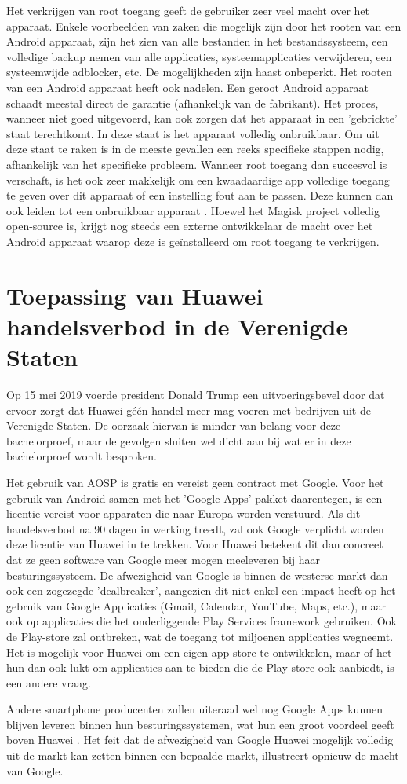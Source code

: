 Het verkrijgen van root toegang geeft de gebruiker zeer veel macht over het apparaat. Enkele voorbeelden van zaken die mogelijk zijn door het rooten van een Android apparaat, zijn het zien van alle bestanden in het bestandssysteem, een volledige backup nemen van alle applicaties, systeemapplicaties verwijderen, een systeemwijde adblocker, etc. De mogelijkheden zijn haast onbeperkt. Het rooten van een Android apparaat heeft ook nadelen. Een geroot Android apparaat schaadt meestal direct de garantie (afhankelijk van de fabrikant). Het proces, wanneer niet goed uitgevoerd, kan ook zorgen dat het apparaat in een 'gebrickte' staat terechtkomt. In deze staat is het apparaat volledig onbruikbaar. Om uit deze staat te raken is in de meeste gevallen een reeks specifieke stappen nodig, afhankelijk van het specifieke probleem. Wanneer root toegang dan succesvol is verschaft, is het ook zeer makkelijk om een kwaadaardige app volledige toegang te geven over dit apparaat of een instelling fout aan te passen. Deze kunnen dan ook leiden tot een onbruikbaar apparaat \autocite{phelps_root-cons}. Hoewel het Magisk project volledig open-source is, krijgt nog steeds een externe ontwikkelaar de macht over het Android apparaat waarop deze is geïnstalleerd om root toegang te verkrijgen.

\section{Toepassing van Huawei handelsverbod in de Verenigde Staten}
Op 15 mei 2019 voerde president Donald Trump een uitvoeringsbevel door dat ervoor zorgt dat Huawei géén handel meer mag voeren met bedrijven uit de Verenigde Staten. De oorzaak hiervan is minder van belang voor deze bachelorproef, maar de gevolgen sluiten wel dicht aan bij wat er in deze bachelorproef wordt besproken.

Het gebruik van AOSP is gratis en vereist geen contract met Google. Voor het gebruik van Android samen met het 'Google Apps' pakket daarentegen, is een licentie vereist voor apparaten die naar Europa worden verstuurd. Als dit handelsverbod na 90 dagen in werking treedt, zal ook Google verplicht worden deze licentie van Huawei in te trekken. Voor Huawei betekent dit dan concreet dat ze geen software van Google meer mogen meeleveren bij haar besturingssysteem. De afwezigheid van Google is binnen de westerse markt dan ook een zogezegde 'dealbreaker', aangezien dit niet enkel een impact heeft op het gebruik van Google Applicaties (Gmail, Calendar, YouTube, Maps, etc.), maar ook op applicaties die het onderliggende Play Services framework gebruiken. Ook de Play-store zal ontbreken, wat de toegang tot miljoenen applicaties wegneemt. Het is mogelijk voor Huawei om een eigen app-store te ontwikkelen, maar of het hun dan ook lukt om applicaties aan te bieden die de Play-store ook aanbiedt, is een andere vraag.

Andere smartphone producenten zullen uiteraad wel nog Google Apps kunnen blijven leveren binnen hun besturingssystemen, wat hun een groot voordeel geeft boven Huawei \autocite{simon_huaweiban}. Het feit dat de afwezigheid van Google Huawei mogelijk volledig uit de markt kan zetten binnen een bepaalde markt, illustreert opnieuw de macht van Google.
